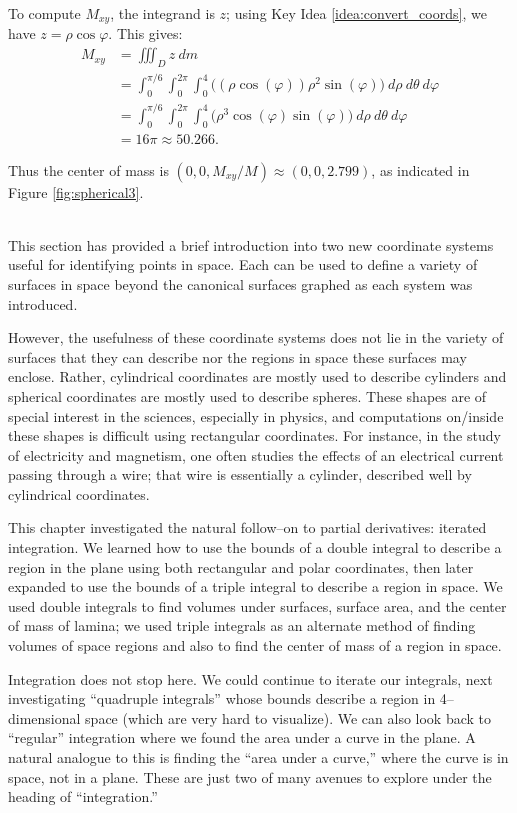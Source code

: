 {To compute $M_{xy}$, the integrand is $z$; using Key Idea \ref{idea:convert_coords}, we have $z = \rho\cos\varphi$. This gives:
\begin{align*}
M_{xy} &= \iiint_D z\ dm \\
	&= \int_0^{\pi/6}\int_0^{2\pi}\int_0^4 \big((\rho\cos(\varphi))\rho^2\sin(\varphi)\big) \ d\rho\ d\theta\ d\varphi\\
	&= \int_0^{\pi/6}\int_0^{2\pi}\int_0^4 \big(\rho^3\cos(\varphi)\sin(\varphi)\big) \ d\rho\ d\theta\ d\varphi\\
	&=16\pi \approx 50.266.
\end{align*}

Thus the center of mass is $(0,0,M_{xy}/M) \approx (0,0,2.799)$, as indicated in Figure \ref{fig:spherical3}. 
}\\

This section has provided a brief introduction into two new coordinate systems useful for identifying points in space. Each can be used to define a variety of surfaces in space beyond the canonical surfaces graphed as each system was introduced.

However, the usefulness of these coordinate systems does not lie in the variety of surfaces that they can describe nor the regions in space these surfaces may enclose. Rather,  cylindrical coordinates are mostly used to describe cylinders and spherical coordinates are mostly used to describe spheres. These shapes are of special interest in the sciences, especially in physics, and computations on/inside these shapes is difficult using rectangular coordinates. For instance, in the study of electricity and magnetism, one often studies the effects of an electrical current passing through a wire; that wire is essentially a cylinder, described well by cylindrical coordinates. \\

\enlargethispage{2\baselineskip}

This chapter investigated the natural follow--on to partial derivatives: iterated integration. We learned how to use the bounds of a double integral to describe a region in the plane using both rectangular and polar coordinates, then later expanded to use the bounds of a triple integral to describe a region in space. We used double integrals to find volumes under surfaces, surface area, and the center of mass of lamina; we used triple integrals as an alternate method of finding volumes of space regions and also to find the center of mass of a region in space.

Integration does not stop here. We could continue to iterate our integrals, next investigating ``quadruple integrals'' whose bounds describe a region in 4--dimensional space (which are very hard to visualize). We can also look back to ``regular'' integration where we found the area under a curve in the plane. A natural analogue to this is finding the ``area under a curve,'' where the curve is in space, not in a plane. These are just two of many avenues to explore under the heading of ``integration.''


